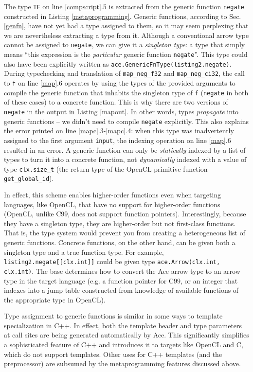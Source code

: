 \documentclass[9pt,preprint]{sigplanconf}
\begin{document}
The type \verb|TF| on line \ref{compscript}.5 is extracted from the generic function \verb|negate| constructed in Listing \ref{metaprogramming}. Generic functions, according to Sec. \ref{genfn}, have not yet had a type assigned to them, so it may seem perplexing that we are nevertheless extracting a type from it. Although a conventional arrow type cannot be assigned to \verb|negate|, we can give it a \emph{singleton type}: a type that simply means ``this expression is the \emph{particular} generic function \verb|negate|''. This type could also have been explicitly written as \verb|ace.GenericFnType(listing2.negate)|. During typechecking and translation of \verb|map_neg_f32| and \verb|map_neg_ci32|, the call to \verb|f| on line \ref{map}.6 operates by using the types of the provided arguments to compile the generic function that inhabits the singleton type of \verb|f| (\verb|negate| in both of these cases) to a concrete function. This is why there are two versions of \verb|negate| in the output in Listing \ref{mapout}. In other words, types \emph{propagate} into generic functions -- we didn't need to compile \verb|negate| explicitly. This also explains the error printed on line \ref{mapc}.3-\ref{mapc}.4: when this type was inadvertently assigned to the first argument \verb|input|, the indexing operation on line \ref{map}.6 resulted in an error. A generic function can only be \emph{statically} indexed by a list of types to turn it into a concrete function, not \emph{dynamically} indexed with a value of type \verb|clx.size_t| (the return type of the OpenCL primitive function \verb|get_global_id|).

In effect, this scheme enables higher-order functions even when targeting languages, like OpenCL, that have no support for higher-order functions (OpenCL, unlike C99, does not support function pointers). Interestingly, because they have a singleton type, they are higher-order but not first-class functions. That is, the type system would prevent you from creating a heterogeneous list of generic functions. Concrete functions, on the other hand, can be given both a singleton type and a true function type. For example, \verb|listing2.negate[[clx.int]]| could be given type \verb|ace.Arrow(clx.int, clx.int)|. The base determines how to convert the Ace arrow type to an arrow type in the target language (e.g. a function pointer for C99, or an integer that indexes into a jump table constructed from knowledge of available functions of the appropriate type in OpenCL).

Type assignment to generic functions is similar in some ways to template specialization in C++. In effect, both the template header and type parameters at call sites are being generated automatically by Ace. This significantly simplifies a sophisticated feature of C++ and introduces it to targets like OpenCL and C, which do not support templates. Other uses for C++ templates (and the preprocessor) are subsumed by the metaprogramming features discussed above.
\end{document}
